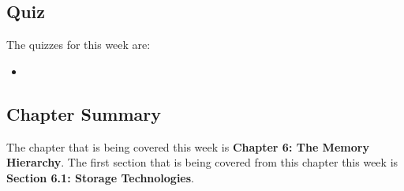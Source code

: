 \subsection{Quiz}

The quizzes for this week are:

\begin{itemize}
    \item {}
\end{itemize}

\subsection{Chapter Summary}

The chapter that is being covered this week is \textbf{Chapter 6: The Memory Hierarchy}. The first section that is being covered from this chapter this week is \textbf{Section 6.1: Storage Technologies}.

